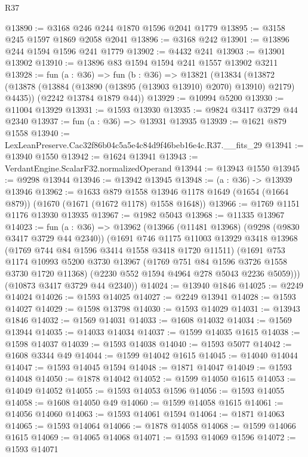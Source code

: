 \begin{lexlean}{R37}
\begin{coremodule}
@13890 := @3168 @246 @244 @1870 @1596 @2041 @1779
@13895 := @3158 @245 @1597 @1869 @2058 @2041
@13896 := @3168 @242
@13901 := @13896 @244 @1594 @1596 @241 @1779
@13902 := @4432 @241
@13903 := @13901 @13902
@13910 := @13896 @83 @1594 @1594 @241 @1557 @13902 @3211
@13928 := fun (a : @36) =>
  fun (b : @36) =>
  @13821
    (@13834
      (@13872 (@13878 (@13884 (@13890 (@13895 (@13903 @13910) @2070) @13910) @2179) @4435))
      (@2242 @13784 @1879 @44))
@13929 := @10994 @5200
@13930 := @11004 @13929
@13931 := @1593 @13930
@13935 := @9824 @3417 @3729 @44 @2340
@13937 := fun (a : @36) => @13931 @13935
@13939 := @1621 @879 @1558
@13940 := LexLeanPreserve.Cac32f86b04c5a5e4c84d9f46beb16e4c.R37.__fits_29
@13941 := @13940 @1550
@13942 := @1624 @13941
@13943 := VerdantEngine.ScalarF32.normalizedOperand
@13944 := @13943 @1550
@13945 := @9298 @13944
@13946 := @13942 @13945
@13948 := (a : @36) -> @13939 @13946
@13962 := @1633
    @879
    @1558
    @13946
    @1178
    @1649
    (@1654 (@1664 @879))
    (@1670 (@1671 (@1672 @1178) @1558 @1648))
@13966 := @1769 @1151 @1176 @13930 @13935
@13967 := @1982 @5043
@13968 := @11335 @13967
@14023 := fun (a : @36) =>
  @13962
    (@13966
      (@11481 @13968)
      (@9298 (@9830 @3417 @3729 @44 @2340))
      (@1691
        @746
        @1175
        @11003
        @13929
        @3418
        @13968
        (@1769 @744 @84 @1596 @3414 @1558 @3418 @1720 @11511)
        (@1691
          @753
          @1174
          @10993
          @5200
          @3730
          @13967
          (@1769 @751 @84 @1596 @3726 @1558 @3730 @1720 @11368)
          (@2230 @552 @1594 @4964 @278 @5043 @2236 @5059)))
      (@10873 @3417 @3729 @44 @2340))
@14024 := @13940 @1846
@14025 := @2249 @14024
@14026 := @1593 @14025
@14027 := @2249 @13941
@14028 := @1593 @14027
@14029 := @1598 @13798
@14030 := @1593 @14029
@14031 := @13943 @1846
@14032 := @1569 @14031
@14033 := @1608 @14032
@14034 := @1569 @13944
@14035 := @14033 @14034
@14037 := @1599 @14035 @1615
@14038 := @1598 @14037
@14039 := @1593 @14038
@14040 := @1593 @5077
@14042 := @1608 @3344 @49
@14044 := @1599 @14042 @1615
@14045 := @14040 @14044
@14047 := @1593 @14045 @1594
@14048 := @1871 @14047
@14049 := @1593 @14048
@14050 := @1878 @14042
@14052 := @1599 @14050 @1615
@14053 := @14049 @14052
@14055 := @1593 @14053 @1596
@14056 := @1593 @14055
@14058 := @1608 @14050 @49
@14060 := @1599 @14058 @1615
@14061 := @14056 @14060
@14063 := @1593 @14061 @1594
@14064 := @1871 @14063
@14065 := @1593 @14064
@14066 := @1878 @14058
@14068 := @1599 @14066 @1615
@14069 := @14065 @14068
@14071 := @1593 @14069 @1596
@14072 := @1593 @14071

\end{coremodule}
\end{lexlean}
